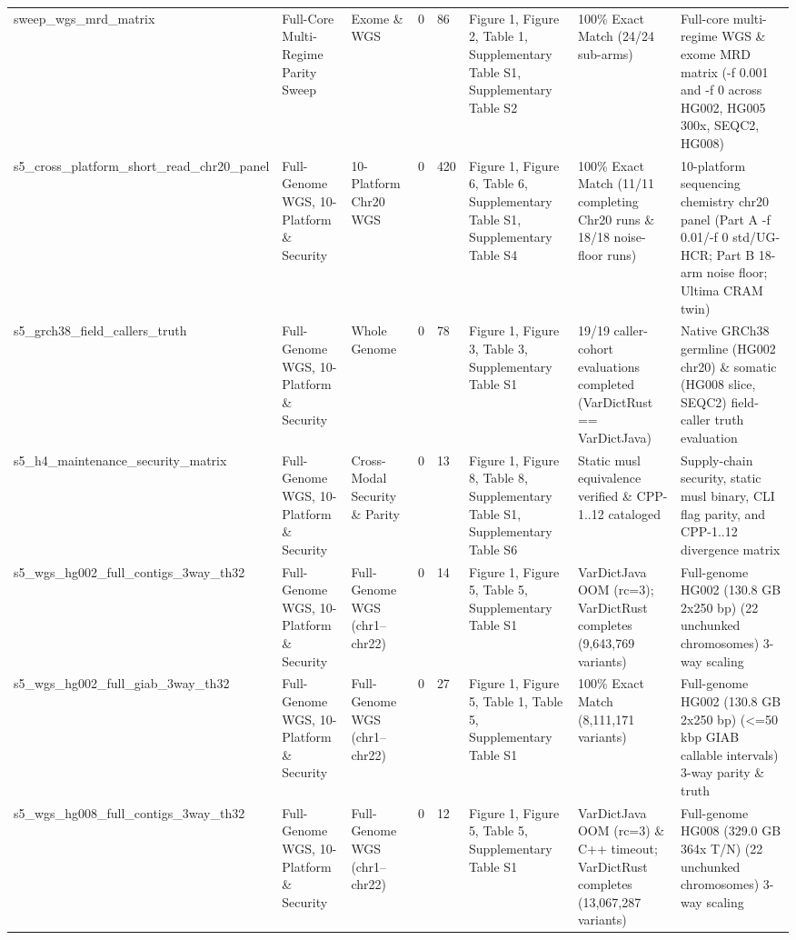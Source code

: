 \begin{table}[htbp]
{\begin{tabular}{llllllll}
sweep\_wgs\_mrd\_matrix & Full-Core Multi-Regime Parity Sweep & Exome \& WGS & 0 & 86 & Figure 1, Figure 2, Table 1, Supplementary Table S1, Supplementary Table S2 & 100\% Exact Match (24/24 sub-arms) & Full-core multi-regime WGS \& exome MRD matrix (-f 0.001 and -f 0 across HG002, HG005 300x, SEQC2, HG008) \\
s5\_cross\_platform\_short\_read\_chr20\_panel & Full-Genome WGS, 10-Platform \& Security & 10-Platform Chr20 WGS & 0 & 420 & Figure 1, Figure 6, Table 6, Supplementary Table S1, Supplementary Table S4 & 100\% Exact Match (11/11 completing Chr20 runs \& 18/18 noise-floor runs) & 10-platform sequencing chemistry chr20 panel (Part A -f 0.01/-f 0 std/UG-HCR; Part B 18-arm noise floor; Ultima CRAM twin) \\
s5\_grch38\_field\_callers\_truth & Full-Genome WGS, 10-Platform \& Security & Whole Genome & 0 & 78 & Figure 1, Figure 3, Table 3, Supplementary Table S1 & 19/19 caller-cohort evaluations completed (VarDictRust == VarDictJava) & Native GRCh38 germline (HG002 chr20) \& somatic (HG008 slice, SEQC2) field-caller truth evaluation \\
s5\_h4\_maintenance\_security\_matrix & Full-Genome WGS, 10-Platform \& Security & Cross-Modal Security \& Parity & 0 & 13 & Figure 1, Figure 8, Table 8, Supplementary Table S1, Supplementary Table S6 & Static musl equivalence verified \& CPP-1..12 cataloged & Supply-chain security, static musl binary, CLI flag parity, and CPP-1..12 divergence matrix \\
s5\_wgs\_hg002\_full\_contigs\_3way\_th32 & Full-Genome WGS, 10-Platform \& Security & Full-Genome WGS (chr1--chr22) & 0 & 14 & Figure 1, Figure 5, Table 5, Supplementary Table S1 & VarDictJava OOM (rc=3); VarDictRust completes (9,643,769 variants) & Full-genome HG002 (130.8 GB 2x250 bp) (22 unchunked chromosomes) 3-way scaling \\
s5\_wgs\_hg002\_full\_giab\_3way\_th32 & Full-Genome WGS, 10-Platform \& Security & Full-Genome WGS (chr1--chr22) & 0 & 27 & Figure 1, Figure 5, Table 1, Table 5, Supplementary Table S1 & 100\% Exact Match (8,111,171 variants) & Full-genome HG002 (130.8 GB 2x250 bp) (\textless{}=50 kbp GIAB callable intervals) 3-way parity \& truth \\
s5\_wgs\_hg008\_full\_contigs\_3way\_th32 & Full-Genome WGS, 10-Platform \& Security & Full-Genome WGS (chr1--chr22) & 0 & 12 & Figure 1, Figure 5, Table 5, Supplementary Table S1 & VarDictJava OOM (rc=3) \& C++ timeout; VarDictRust completes (13,067,287 variants) & Full-genome HG008 (329.0 GB 364x T/N) (22 unchunked chromosomes) 3-way scaling \\

\end{tabular}}
\end{table}
